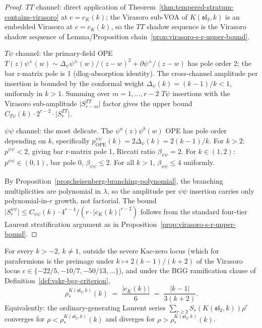 \begin{proof}
$TT$ channel: direct application of
Theorem~\ref{thm:tempered-stratum-contains-virasoro} at $c = c_K(k)$;
the Virasoro sub-VOA of $K(\mathfrak{sl}_2, k)$ is an embedded
Virasoro at $c = c_K(k)$, so the $TT$ shadow sequence is the
Virasoro shadow sequence of Lemma/Proposition
chain~\ref{prop:virasoro-s-r-upper-bound}.

$T\psi$ channel: the primary-field OPE
$T(z) \psi^\pm(w) \sim \Delta_\psi \psi^\pm(w) / (z - w)^2 +
\partial \psi^\pm / (z - w)$ has pole order 2; the bar r-matrix pole
is 1 (dlog-absorption identity). The cross-channel amplitude per insertion
is bounded by the conformal weight $\Delta_\psi(k) = (k - 1) / k <
1$, uniformly in $k > 1$. Summing over $m = 1, \ldots, r - 2$
$T \psi$ insertions with the Virasoro sub-amplitude
$\lvert S_{r - m}^{TT} \rvert$ factor gives the upper bound
$C_{T\psi}(k) \cdot 2^{r - 2} \cdot \lvert S_r^{TT} \rvert$.

$\psi\psi$ channel: the most delicate. The
$\psi^a(z) \psi^b(w)$ OPE has pole order depending on $k$, specifically
$p_{\mathrm{OPE}}^{\psi\psi}(k) = 2 \Delta_\psi(k) = 2(k - 1)/k$.
For $k > 2$: $p^{\psi\psi} < 2$, giving bar r-matrix pole 1, Riccati
ratio $\beta_{\psi\psi} = 2$. For $k \in (1, 2)$:
$p^{\psi\psi} \in (0, 1)$, bar pole 0, $\beta_{\psi\psi} \le 2$. For
all $k > 1$, $\beta_{\psi\psi} \le 4$ uniformly.

By Proposition~\ref{prop:heisenberg-branching-polynomial}, the
branching multiplicities are polynomial in $\lambda$, so the
amplitude per $\psi\psi$ insertion carries only polynomial-in-$r$
growth, not factorial. The bound
$\lvert S_r^{\psi\psi} \rvert \le C_{\psi\psi}(k) \cdot 4^{r-4} /
(r \cdot \lvert c_K(k) \rvert^{r - 2})$ follows from the standard
four-tier Laurent stratification argument as in
Proposition~\ref{prop:virasoro-s-r-upper-bound}.
\end{proof}

\begin{proposition}
\label{prop:parafermion-rho-star-closed-form}
\ClaimStatusConditional
For every $k > -2$, $k \neq 1$, outside the severe Kac-zero locus
(which for parafermions is the preimage under $k \mapsto 2(k-1)/(k+2)$
of the Virasoro locus $c \in \{-22/5, -10/7, -50/13, \ldots\}$), and
under the BGG ramification clause of
Definition~\ref{def:vskr-bgg-criterion},
\[
 \rho_*^{K(\mathfrak{sl}_2, k)}(k)
 \;=\;
 \frac{\lvert c_K(k) \rvert}{6}
 \;=\;
 \frac{\lvert k - 1 \rvert}{3 (k + 2)}.
\]
Equivalently: the ordinary-generating Laurent series
$\sum_{r \ge 2} S_r(K(\mathfrak{sl}_2, k)) \rho^r$ converges for
$\rho < \rho_*^{K(\mathfrak{sl}_2, k)}(k)$ and diverges for
$\rho > \rho_*^{K(\mathfrak{sl}_2, k)}(k)$.
\end{proposition}


